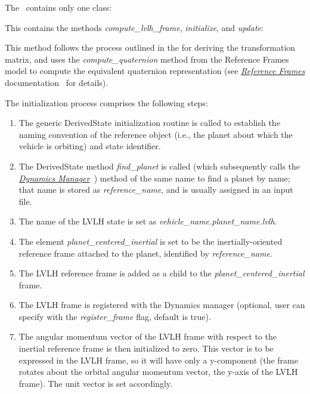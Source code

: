 The \LVLHDesc\ contains only one class:
\begin{itemize}

This contains the methods \textit{compute\_lvlh\_frame}, \textit{initialize}, and \textit{update}:
\begin{enumerate}

This method follows the process outlined in the  for deriving the transformation matrix, and uses the \textit{compute\_quaternion} method from the Reference Frames model to compute the equivalent quaternion representation (see \href{file:\JEODHOME/models/utils/ref\_frames/docs/ref\_frames.pdf}{\em Reference Frames} documentation~\cite{dynenv:REFFRAMES} for details).

The initialization process comprises the following steps:
\begin{enumerate}
\item{} The generic DerivedState initialization routine is called to establish the naming convention of the reference object (i.e., the planet about which the vehicle is orbiting) and state identifier.
\item{} The DerivedState method \textit{find\_planet} is called (which subsequently calls the  \href{file:\JEODHOME/models/dynamics/dyn_manager/docs/dyn_manager.pdf}{\em Dynamics Manager}~\cite{dynenv:DYNMANAGER}) method of the same name to find a planet by name; that name is stored as \textit{reference\_name}, and is usually assigned in an input file.
\item{} The name of the LVLH state is set as \textit{vehicle\_name.planet\_name.lvlh}.
\item{} The element \textit{planet\_centered\_inertial} is set to be the inertially-oriented reference frame attached to the planet, identified by \textit{reference\_name}.
\item{} The LVLH reference frame is added as a child to the \textit{planet\_centered\_inertial} frame.
\item{} The LVLH frame is registered with the Dynamics manager (optional, user can specify with the \textit{register\_frame} flag, default is true).
\item {} The angular momentum vector of the LVLH frame with respect to the inertial reference frame is then initialized to zero.  This vector is to be expressed in the LVLH frame, so it will have only a y-component (the frame rotates about the orbital angular momentum vector, the y-axis of the LVLH frame).  The unit vector is set accordingly.
\end{enumerate}


\end{enumerate}
\end{itemize}
